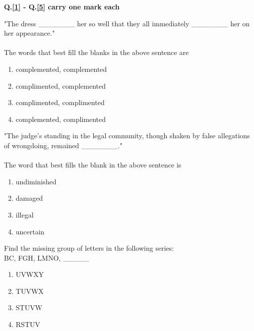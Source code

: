 \iffalse
\chapter{2018}
\author{AI24BTECH11015 - Harshvardhan Patidar}
\section{ma}
\fi
\item[] \textbf{Q.\ref{1} - Q.\ref{5} carry one mark each}

    \item \label{1} "The dress \_\_\_\_\_\_\_ her so well that they all immediately \_\_\_\_\_\_\_ her on her appearance."\\ \\ The words that best fill the blanks in the above sentence are
        \begin{enumerate}
            \item complemented, complemented
            \item complimented, complemented
            \item complimented, complimented
            \item complemented, complimented
        \end{enumerate} 

    \item "The judge's standing in the legal community, though shaken by false allegations of wrongdoing, remained \_\_\_\_\_\_\_." \\ \\ The word that best fills the blank in the above sentence is 
        \begin{enumerate}
            \item undiminished
            \item damaged
            \item illegal
            \item uncertain
        \end{enumerate}

    \item Find the missing group of letters in the following series:\\ BC, FGH, LMNO, \_\_\_\_\_
        \begin{enumerate}
            \item UVWXY
            \item TUVWX
            \item STUVW
            \item RSTUV
        \end{enumerate}

